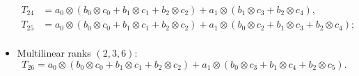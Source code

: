 \begin{itemize}
\begin{align*}
T_{24} &= a_0 \otimes (b_0 \otimes c_0 + b_1 \otimes c_1 + b_2 \otimes c_2) + a_1 \otimes (b_1 \otimes c_3 + b_2 \otimes c_4), \\
T_{25} &= a_0 \otimes (b_0 \otimes c_0 +  b_1 \otimes c_1 + b_2 \otimes c_2) + a_1 \otimes (b_0 \otimes c_2 + b_1 \otimes c_3 + b_2 \otimes c_4);\\
\end{align*}
\item Multilinear ranks $(2,3,6)$:
\[
T_{26} = a_0 \otimes (b_0 \otimes c_0 +  b_1 \otimes c_1 + b_2 \otimes c_2) + a_1 \otimes (b_0 \otimes c_3 + b_1 \otimes c_4 + b_2 \otimes c_5).
\]
\end{itemize}

% 
